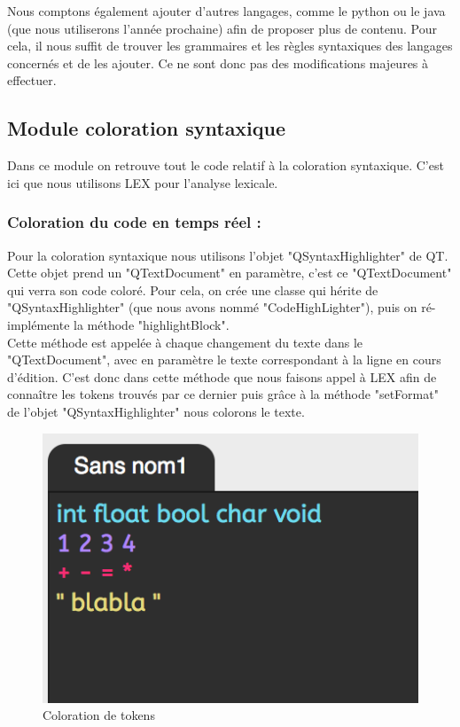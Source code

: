 \documentclass[a4paper,12pt]{article}
\begin{document}
				Nous comptons également ajouter d'autres langages, comme le python ou le java (que nous utiliserons l'année prochaine) afin de proposer plus de contenu. Pour cela, il nous suffit de trouver les grammaires et les règles syntaxiques des langages concernés et de les ajouter. Ce ne sont donc pas des modifications majeures à effectuer.
			
		\subsection{Module coloration syntaxique}	
		
		Dans ce module on retrouve tout le code relatif à la coloration syntaxique. C’est ici que nous utilisons LEX pour l’analyse lexicale.  
		
		\subsubsection*{Coloration du code en temps réel :}

	Pour la coloration syntaxique nous utilisons l’objet "QSyntaxHighlighter" de QT. Cette objet prend un "QTextDocument" en paramètre, c’est ce "QTextDocument" qui verra son code coloré. Pour cela, on crée une classe qui hérite de "QSyntaxHighlighter" (que nous avons nommé "CodeHighLighter"), puis on ré-implémente la méthode "highlightBlock".\\
	 Cette méthode est appelée à chaque changement du texte dans le "QTextDocument", avec en paramètre le texte correspondant à la ligne en cours d’édition. C’est donc dans cette méthode que nous faisons appel à LEX afin de connaître les tokens trouvés par ce dernier puis grâce à la méthode "setFormat" de l’objet "QSyntaxHighlighter" nous colorons le texte.
	 
	 \begin{figure}[h!]
			\begin{center}
				\includegraphics[scale=1]{images/color}
				\caption{Coloration de tokens}
			\end{center}
		\end{figure}
		
\end{document}
